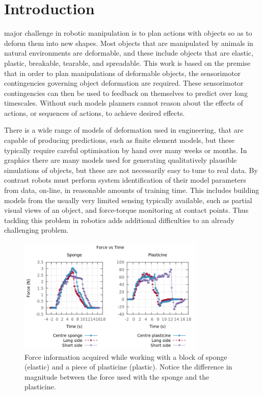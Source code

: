 \documentclass[journal]{IEEEtran}
\begin{document}
\section{Introduction}
% 
% 
% 
% 
 major challenge in robotic manipulation is to plan actions with objects so as to deform them into new shapes. Most objects that are manipulated by animals in natural environments are deformable, and these include objects that are elastic, plastic, breakable, tearable, and spreadable. This work is based on the premise that in order to plan manipulations of deformable objects, the sensorimotor contingencies governing object deformation are required. These sensorimotor contingencies can then be used to feedback on themselves to predict over long timescales. Without such models planners cannot reason about the effects of actions, or sequences of actions, to achieve desired effects.

There is a wide range of models of deformation used in engineering, that are capable of producing predictions, such as finite element models, but these typically require careful optimisation by hand over many weeks or months. In graphics there are many models used for generating qualitatively plausible simulations of objects, but these are not necessarily easy to tune to real data. By contrast robots must perform system identification of their model parameters from data, on-line, in reasonable amounts of training time. This includes building models from the usually very limited sensing typically available, such as partial visual views of an object, and force-torque monitoring at contact points. Thus tackling this problem in robotics adds additional difficulties to an already challenging problem.

\begin{figure}[!t]
\centering\includegraphics[width=3.5in]{arrio17.png}
\caption{Force information acquired while working with a block of sponge (elastic) and a piece of plasticine (plastic).  Notice the difference in magnitude between the force used with the sponge and the plasticine.}
\label{fig:forceElasticPlastic}
\end{figure}
\end{document}
